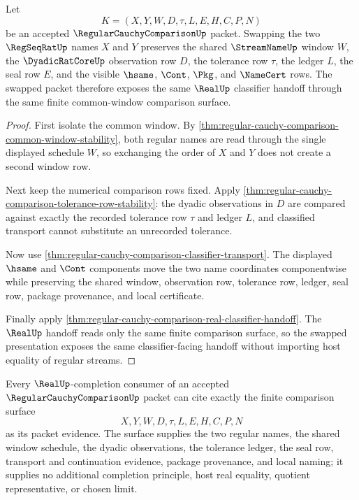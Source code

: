 \begin{theorem}
\label{thm:regular-cauchy-comparison-symmetric-window-swap}
Let
$$
K=(X,Y,W,D,\tau,L,E,H,C,P,N)
$$
be an accepted $\RegularCauchyComparisonUp$ packet. Swapping the two $\RegSeqRatUp$ names $X$ and $Y$ preserves the shared $\StreamNameUp$ window $W$, the $\DyadicRatCoreUp$ observation row $D$, the tolerance row $\tau$, the ledger $L$, the seal row $E$, and the visible $\hsame$, $\Cont$, $\Pkg$, and $\NameCert$ rows. The swapped packet therefore exposes the same $\RealUp$ classifier handoff through the same finite common-window comparison surface.
\end{theorem}
\begin{proof}
First isolate the common window. By \autoref{thm:regular-cauchy-comparison-common-window-stability}, both regular names are read through the single displayed schedule $W$, so exchanging the order of $X$ and $Y$ does not create a second window row.

Next keep the numerical comparison rows fixed. Apply \autoref{thm:regular-cauchy-comparison-tolerance-row-stability}: the dyadic observations in $D$ are compared against exactly the recorded tolerance row $\tau$ and ledger $L$, and classified transport cannot substitute an unrecorded tolerance.

Now use \autoref{thm:regular-cauchy-comparison-classifier-transport}. The displayed $\hsame$ and $\Cont$ components move the two name coordinates componentwise while preserving the shared window, observation row, tolerance row, ledger, seal row, package provenance, and local certificate.

Finally apply \autoref{thm:regular-cauchy-comparison-real-classifier-handoff}. The $\RealUp$ handoff reads only the same finite comparison surface, so the swapped presentation exposes the same classifier-facing handoff without importing host equality of regular streams.
\end{proof}

\begin{theorem}
\label{thm:regular-cauchy-comparison-completion-consumer-surface}
Every $\RealUp$-completion consumer of an accepted $\RegularCauchyComparisonUp$ packet can cite exactly the finite comparison surface
$$
X,Y,W,D,\tau,L,E,H,C,P,N
$$
as its packet evidence. The surface supplies the two regular names, the shared window schedule, the dyadic observations, the tolerance ledger, the seal row, transport and continuation evidence, package provenance, and local naming; it supplies no additional completion principle, host real equality, quotient representative, or chosen limit.
\end{theorem}

